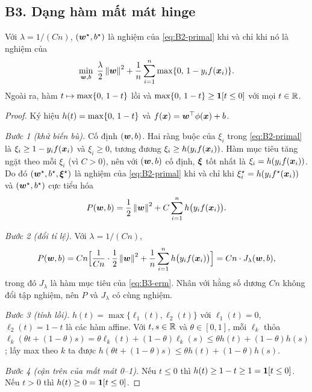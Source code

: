 \subsection{B3. Dạng hàm mất mát hinge}\label{sec:B3}

\begin{proposition}\label{prop:B3-hinge}
Với $\lambda = 1/(Cn)$, $(\bm{w}^\star, b^\star)$ là nghiệm của \eqref{eq:B2-primal}
khi và chỉ khi nó là nghiệm của
\begin{equation}\label{eq:B3-erm}
  \min_{\bm{w}, b} \; \frac{\lambda}{2}\left\lVert \bm{w} \right\rVert^2
  + \frac{1}{n}\sum_{i=1}^n \max\{0,\, 1 - y_i f(\bm{x}_i)\}.
\end{equation}
Ngoài ra, hàm $t \mapsto \max\{0,\, 1 - t\}$ lồi và $\max\{0,\, 1 - t\} \ge \mathbf{1}\!\left[t \le 0\right]$ với mọi $t \in \mathbb{R}$.
\end{proposition}

\begin{proof}
Ký hiệu $h(t) = \max\{0,\, 1 - t\}$ và $f(\bm{x}) = \bm{w}^{\top}\phi(\bm{x}) + b$.

\emph{Bước 1 (khử biến bù).} Cố định $(\bm{w}, b)$. Hai ràng buộc của $\xi_i$ trong
\eqref{eq:B2-primal} là $\xi_i \ge 1 - y_i f(\bm{x}_i)$ và $\xi_i \ge 0$, tương đương
$\xi_i \ge h(y_i f(\bm{x}_i))$. Hàm mục tiêu tăng ngặt theo mỗi $\xi_i$ (vì $C > 0$), nên với
$(\bm{w}, b)$ cố định, $\bm{\xi}$ tốt nhất là $\xi_i = h(y_i f(\bm{x}_i))$. Do đó $(\bm{w}^\star, b^\star, \bm{\xi}^\star)$
là nghiệm của \eqref{eq:B2-primal} khi và chỉ khi $\xi_i^\star = h(y_i f^\star(\bm{x}_i))$ và
$(\bm{w}^\star, b^\star)$ cực tiểu hóa
\[
  P(\bm{w}, b) = \frac12\left\lVert \bm{w} \right\rVert^2 + C\sum_{i=1}^n h\bigl(y_i f(\bm{x}_i)\bigr).
\]

\emph{Bước 2 (đổi tỉ lệ).} Với $\lambda = 1/(Cn)$,
\[
  P(\bm{w}, b) = Cn\Bigl[\frac{1}{Cn}\cdot\frac12\left\lVert \bm{w} \right\rVert^2 + \frac1n\sum_{i=1}^n h\bigl(y_i f(\bm{x}_i)\bigr)\Bigr]
  = Cn \cdot J_\lambda(\bm{w}, b),
\]
trong đó $J_\lambda$ là hàm mục tiêu của \eqref{eq:B3-erm}. Nhân với hằng số dương $Cn$
không đổi tập nghiệm, nên $P$ và $J_\lambda$ có cùng nghiệm.

\emph{Bước 3 (tính lồi).} $h(t) = \max\{\ell_1(t), \ell_2(t)\}$ với $\ell_1(t) = 0$,
$\ell_2(t) = 1 - t$ là các hàm affine. Với $t, s \in \mathbb{R}$ và $\theta \in [0, 1]$, mỗi $\ell_k$ thỏa
$\ell_k(\theta t + (1-\theta)s) = \theta\ell_k(t) + (1-\theta)\ell_k(s) \le \theta h(t) + (1-\theta)h(s)$;
lấy max theo $k$ ta được $h(\theta t + (1-\theta)s) \le \theta h(t) + (1-\theta)h(s)$.

\emph{Bước 4 (cận trên của mất mát 0--1).} Nếu $t \le 0$ thì $h(t) \ge 1 - t \ge 1 = \mathbf{1}\!\left[t \le 0\right]$.
Nếu $t > 0$ thì $h(t) \ge 0 = \mathbf{1}\!\left[t \le 0\right]$.
\end{proof}

